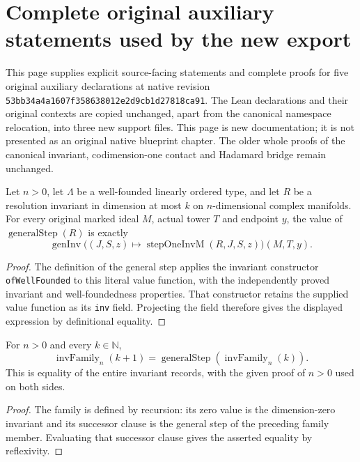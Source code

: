 \section{Complete original auxiliary statements used by the new export}

This page supplies explicit source-facing statements and complete proofs for
five original auxiliary declarations at native revision
\texttt{53bb34a4a1607f358638012e2d9cb1d27818ca91}. The Lean declarations and
their original contexts are copied unchanged, apart from the canonical
namespace relocation, into three new support files. This page is new
documentation; it is not presented as an original native blueprint chapter.
The older whole proofs of the canonical invariant, codimension-one contact
and Hadamard bridge remain unchanged.

\begin{lemma}
\label{pub:canonical-general-step-value}
\leanok
Let $n>0$, let $\Lambda$ be a well-founded linearly ordered type, and let $R$
be a resolution invariant in dimension at most $k$ on $n$-dimensional complex
manifolds. For every original marked ideal $M$, actual tower $T$ and endpoint
$y$, the value of $\operatorname{generalStep}(R)$ is exactly
\[
 \operatorname{genInv}\bigl((J,S,z)\mapsto
       \operatorname{stepOneInvM}(R,J,S,z)\bigr)(M,T,y).
\]
\end{lemma}
\begin{proof}
The definition of the general step applies the invariant constructor
\texttt{ofWellFounded} to this literal value function, with the independently
proved invariant and well-foundedness properties. That constructor retains
the supplied value function as its \texttt{inv} field. Projecting the field
therefore gives the displayed expression by definitional equality.
\end{proof}

\begin{lemma}
\label{pub:canonical-invariant-successor}
\leanok
For $n>0$ and every $k\in\mathbb N$,
\[
 \operatorname{invFamily}_n(k+1)
   =\operatorname{generalStep}(\operatorname{invFamily}_n(k)).
\]
This is equality of the entire invariant records, with the given proof of
$n>0$ used on both sides.
\end{lemma}
\begin{proof}
The family is defined by recursion: its zero value is the dimension-zero
invariant and its successor clause is the general step of the preceding
family member. Evaluating that successor clause gives the asserted equality
by reflexivity.
\end{proof}

